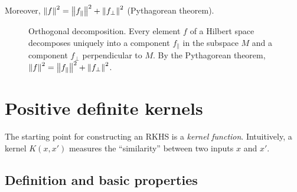 \begin{notechapter}
\begin{theorem}
Moreover, $\left\|f\right\|^2 = \left\|f_\parallel\right\|^2 + \left\|f_\perp\right\|^2$
(Pythagorean theorem).
\end{theorem}

\begin{figure}[ht]
\centering
{}
\caption{Orthogonal decomposition. Every element $f$ of a Hilbert space
decomposes uniquely into a component $f_\parallel$ in the subspace $M$
and a component $f_\perp$ perpendicular to $M$. By the Pythagorean
theorem, $\left\|f\right\|^2 = \left\|f_\parallel\right\|^2 + \left\|f_\perp\right\|^2$.}
\label{rkhs:fig:ortho_decomp}
\end{figure}


\section{Positive definite kernels}
\label{rkhs:sec:kernels}

The starting point for constructing an RKHS is a \emph{kernel function}.
Intuitively, a kernel $K(x,x')$ measures the ``similarity'' between two
inputs $x$ and $x'$.

\subsection{Definition and basic properties}
\label{rkhs:subsec:kernel_def}


\end{notechapter}
